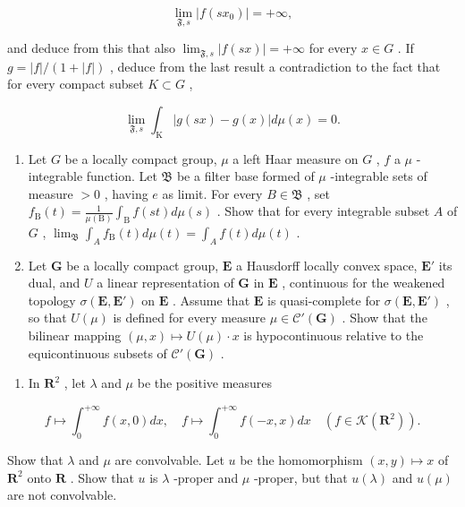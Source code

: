 \[
\lim _ {\mathfrak {F}, s} | f (s x _ {0}) | = + \infty ,
\]

and deduce from this that also \(\lim_{\mathfrak{F},s}|f(sx)| = +\infty\) for every \(x \in G\) . If \(g = |f| / (1 + |f|)\) , deduce from the last result a contradiction to the fact that for every compact subset \(K \subset G\) ,

\[
\lim _ {\mathfrak {F}, s} \int_ {\mathrm{K}} | g (s x) - g (x) | d \mu (x) = 0.
\]

\begin{enumerate}
\def\labelenumi{\arabic{enumi})}
\setcounter{enumi}{8}
\item
  Let \(G\) be a locally compact group, \(\mu\) a left Haar measure on \(G\) , \(f\) a \(\mu\) -integrable function. Let \(\mathfrak{B}\) be a filter base formed of \(\mu\) -integrable sets of measure \(> 0\) , having \(e\) as limit. For every \(B \in \mathfrak{B}\) , set \(f_{\mathrm{B}}(t) = \frac{1}{\mu(\mathrm{B})} \int_{\mathrm{B}} f(st) d\mu(s)\) . Show that for every integrable subset \(A\) of \(G\) , \(\lim_{\mathfrak{B}} \int_{A} f_{\mathrm{B}}(t) d\mu(t) = \int_{A} f(t) d\mu(t)\) .
\item
  Let \(\mathbf{G}\) be a locally compact group, \(\mathbf{E}\) a Hausdorff locally convex space, \(\mathbf{E}'\) its dual, and \(U\) a linear representation of \(\mathbf{G}\) in \(\mathbf{E}\) , continuous for the weakened topology \(\sigma(\mathbf{E},\mathbf{E}')\) on \(\mathbf{E}\) . Assume that \(\mathbf{E}\) is quasi-complete for \(\sigma(\mathbf{E},\mathbf{E}')\) , so that \(U(\mu)\) is defined for every measure \(\mu \in \mathcal{C}'(\mathbf{G})\) . Show that the bilinear mapping \((\mu,x) \mapsto U(\mu) \cdot x\) is hypocontinuous relative to the equicontinuous subsets of \(\mathcal{C}'(\mathbf{G})\) .
\end{enumerate}

\exercisesection{}

\begin{enumerate}
\def\labelenumi{\arabic{enumi})}
\tightlist
\item
  In \(\mathbf{R}^2\) , let \(\lambda\) and \(\mu\) be the positive measures
\end{enumerate}

\[
f \mapsto \int_ {0} ^ {+ \infty} f (x, 0) d x, \quad f \mapsto \int_ {0} ^ {+ \infty} f (- x, x) d x \quad \left(f \in \mathcal {K} (\mathbf {R} ^ {2})\right).
\]

Show that \(\lambda\) and \(\mu\) are convolvable. Let \(u\) be the homomorphism \((x,y) \mapsto x\) of \(\mathbf{R}^2\) onto \(\mathbf{R}\) . Show that \(u\) is \(\lambda\) -proper and \(\mu\) -proper, but that \(u(\lambda)\) and \(u(\mu)\) are not convolvable.

